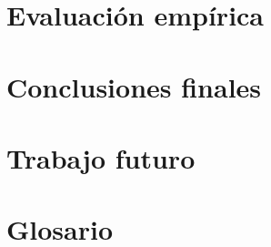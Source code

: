\documentclass[a4paper, 11pt]{book}
\begin{document}
\begin{sloppypar}
\chapter{Evaluación empírica}\label{chapter:evaluation}


\chapter{Conclusiones finales}\label{chapter:conclusions}


\chapter{Trabajo futuro}\label{chapter:future-work}


\chapter{Glosario}\label{chapter:glossary}






% 


% 


% 



% 
\end{sloppypar}
\end{document}
